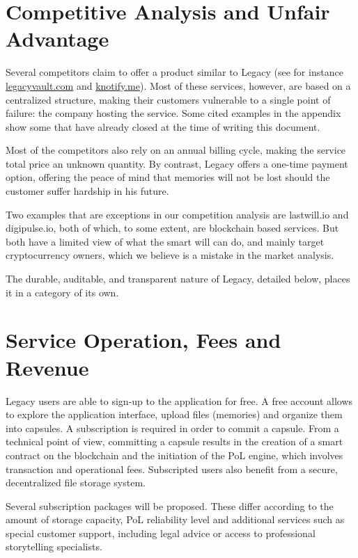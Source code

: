 
\section{Competitive Analysis and Unfair Advantage} %
\label{sec:competitive_analysis_and_unfair_advantage}

Several competitors claim to offer a product similar to Legacy (see for instance \url{legacyvault.com} and \url{knotify.me}). Most of these services, however, are based on a centralized structure, making their customers vulnerable to a single point of failure: the company hosting the service. Some cited examples in the appendix show some that have already closed at the time of writing this document.

Most of the competitors also rely on an annual billing cycle, making the service total price an unknown quantity. By contrast, Legacy offers a one-time payment option, offering the peace of mind that memories will not be lost should the customer suffer hardship in his future.

Two examples that are exceptions in our competition analysis are lastwill.io and digipulse.io, both of which, to some extent, are blockchain based services. But both have a limited view of what the smart will can do, and mainly target cryptocurrency owners, which we believe is a mistake in the market analysis.

The durable, auditable, and transparent nature of Legacy, detailed below, places it in a category of its own.


\section{Service Operation, Fees and Revenue} %
\label{sec:service_operation_fees_and_revenue}
Legacy users are able to sign-up to the application for free. A free account allows to explore the application interface, upload files (memories) and organize them into capsules. A subscription is required in order to commit a capsule. From a technical point of view, committing a capsule results in the creation of a smart contract on the blockchain and the initiation of the PoL engine, which involves transaction and operational fees. Subscripted users also benefit from a secure, decentralized file storage system.

Several subscription packages will be proposed. These differ according to the amount of storage capacity, PoL reliability level and additional services such as special customer support, including legal advice or access to professional storytelling specialists.

